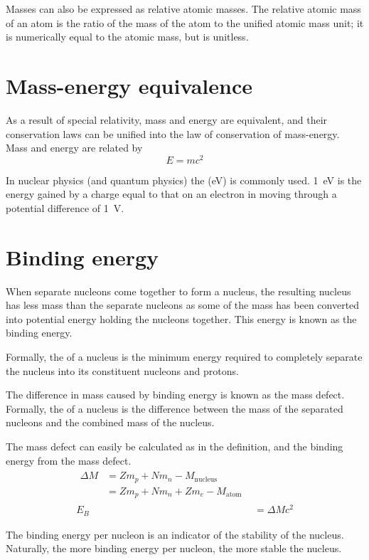 \documentclass[Physics.tex]{subfiles}
\begin{document}
Masses can also be expressed as relative atomic masses. The relative atomic mass of an atom is the ratio of the mass of the atom to the unified atomic mass unit; it is numerically equal to the atomic mass, but is unitless.
\section{Mass-energy equivalence}
As a result of special relativity, mass and energy are equivalent, and their conservation laws can be unified into the law of conservation of mass-energy. Mass and energy are related by \begin{equation}E = mc^2\end{equation}

In nuclear physics (and quantum physics) the  (\si{\electronvolt}) is commonly used. \SI{1}{\electronvolt} is the energy gained by a charge equal to that on an electron in moving through a potential difference of \SI{1}{\volt}.
\section{Binding energy}
When separate nucleons come together to form a nucleus, the resulting nucleus has less mass than the separate nucleons as some of the mass has been converted into potential energy holding the nucleons together. This energy is known as the binding energy.

Formally, the  of a nucleus is the minimum energy required to completely separate the nucleus into its constituent nucleons and protons.

The difference in mass caused by binding energy is known as the mass defect. Formally, the  of a nucleus is the difference between the mass of the separated nucleons and the combined mass of the nucleus.

The mass defect can easily be calculated as in the definition, and the binding energy from the mass defect. \begin{align}\begin{split}\Delta M &= Zm_p + Nm_n - M_\text{nucleus}\\&= Zm_p + Nm_n + Zm_e - M_\text{atom}\end{split}\\E_B &= \Delta Mc^2\end{align}

The binding energy per nucleon is an indicator of the stability of the nucleus. Naturally, the more binding energy per nucleon, the more stable the nucleus.
\end{document}

